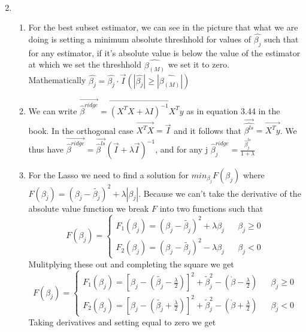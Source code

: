 \documentclass{article}
\begin{document}
\begin{enumerate}
\begin{eqnarray*}
      \end{eqnarray*}
    \item
      \begin{enumerate}
        \item For the best subset estimator, we can see in the picture that what we are doing is setting a minimum absolute threshhold for values of $\hat{\beta_j}$ such that for any estimator, if it's absolute value is below the value of the estimator at which we set the threshhold $\hat{\beta_{(M)}}$ we set it to zero.\\ Mathematically $\hat{\beta_j} = \hat{\beta_j}\cdot\vec{I}(|\hat{\beta_j}| \ge |\hat{\beta_{(M)}}|)$
        \item We can write $\vec{\hat{\beta}^{ridge}} = \vec{(X^TX + \lambda I)^{-1}X^Ty}$ as in equation 3.44 in the book. In the orthogonal case $\vec{X^TX} = \vec{I}$ and it follows that $\vec{\hat{\beta^{ls}}} =  \vec{X^Ty}$. We thus have $\vec{\hat{\beta}^{ridge}} = \vec{\hat{\beta}^{ls}}(\vec{I} + \lambda\vec{I})^{-1}$, and for any j $\hat{\beta}_j^{ridge} = \frac{\hat{\beta}_j^{ls}}{1 + \lambda}$
          \item For the Lasso we need to find a solution for $min_{\beta_j} F(\beta_j)$ where $F(\beta_j) = (\beta_j - \tilde{\beta_j})^2 + \lambda|\beta_j|$. Because we can't take the derivative of the absolute value function we break $F$ into two functions such that 
        $$
          F(\beta_j) = \left\{ \begin{array}{lcl}F_1(\beta_j) =  (\beta_j - \tilde{\beta_j})^2 + \lambda \beta_j & & \beta_j \ge 0\\
                                          F_2(\beta_j) =  (\beta_j - \tilde{\beta_j})^2 - \lambda \beta_j & & \beta_j < 0
                        \end{array}
                        \right.
        $$
        Mulitplying these out and completing the square we get 
        $$
        F(\beta_j) = \left\{ \begin{array}{lcl}F_1(\beta_j) =  [\beta_j - (\tilde{\beta_j} - \frac{\lambda}{2})]^2 + \tilde{\beta}_j^2 - (\grave{\beta} -\frac{\lambda}{2}) & & \beta_j \ge 0\\
                                          F_2(\beta_j) =  [\beta_j - (\tilde{\beta_j} + \frac{\lambda}{2})]^2 + \tilde{\beta}_j^2 - (\grave{\beta} +\frac{\lambda}{2}) & & \beta_j < 0
                        \end{array}
                        \right.
        $$
        Taking derivatives and setting equal to zero we get

\end{enumerate}
\end{enumerate}
\end{document}
